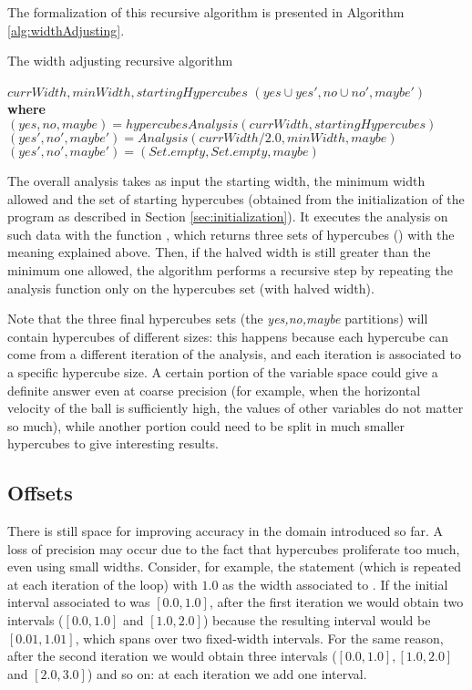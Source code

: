 The formalization of this recursive algorithm is presented in Algorithm \ref{alg:widthAdjusting}.

\begin{algorithm}
\caption{The width adjusting recursive algorithm} \label{alg:widthAdjusting}
\begin{algorithmic} 
 {$currWidth, minWidth, startingHypercubes$}
  \State \Return $(yes \cup yes', no \cup no', maybe')$
  \State \textbf{where}
    \State $(yes, no, maybe) = hypercubesAnalysis(currWidth, startingHypercubes )$
      \State $(yes', no', maybe') = Analysis(currWidth/2.0, minWidth, maybe)$
    \Else
      \State $(yes', no', maybe') = (Set.empty, Set.empty, maybe)$
    \EndIf
\EndFunction
\end{algorithmic}
\end{algorithm}

The overall analysis takes as input the starting width, the minimum width allowed and the set of starting hypercubes (obtained from the initialization of the program as described in Section \ref{sec:initialization}). It executes the analysis on such data with the function , which returns three sets of hypercubes () with the meaning explained above. Then, if the halved width is still greater than the minimum one allowed, the algorithm performs a recursive step by repeating the analysis function only on the  hypercubes set (with halved width). 

Note that %
the three final hypercubes sets (the \emph{yes,no,maybe} partitions)
will contain hypercubes of different sizes: this happens because each hypercube can come from a different iteration of the analysis, and each iteration is associated to a specific hypercube size. A certain portion of the variable space could give a definite answer even at coarse precision (for example, when the horizontal velocity of the ball is sufficiently high, the values of other variables do not matter so much), while another portion could need to be split in much smaller hypercubes to give interesting results.

\subsection{Offsets}
There is still space for improving accuracy in the domain introduced so far. A loss of precision may occur due to the fact that hypercubes proliferate too much, even using small widths. Consider, for example, the statement  (which is repeated at each iteration of the  loop) with $1.0$ as the width associated to . If the initial interval associated to  was $[0.0,1.0]$, after the first iteration we would obtain two intervals ($[0.0,1.0]$ and $[1.0,2.0]$) because the resulting interval would be $[0.01,1.01]$, which spans over two fixed-width intervals. For the same reason, after the second iteration we would obtain three intervals ($[0.0,1.0],[1.0,2.0]$ and $[2.0,3.0]$) and so on: at each iteration we add one interval. 


